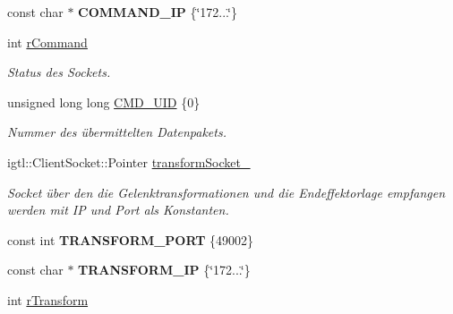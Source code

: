 \begin{DoxyCompactItemize}
\item 
\hypertarget{classRosOpenIgtlBridge_a808bb79742c62aaea43bf539f1ac677a}{const char $\ast$ {\bfseries C\-O\-M\-M\-A\-N\-D\-\_\-\-I\-P} \{\char`\"{}172...\char`\"{}\}}\label{classRosOpenIgtlBridge_a808bb79742c62aaea43bf539f1ac677a}

\item 
\hypertarget{classRosOpenIgtlBridge_ad0b28209a738b231f97717f234e380ec}{int \hyperlink{classRosOpenIgtlBridge_ad0b28209a738b231f97717f234e380ec}{r\-Command}}\label{classRosOpenIgtlBridge_ad0b28209a738b231f97717f234e380ec}

\begin{DoxyCompactList}\small\item\em Status des Sockets. \end{DoxyCompactList}\item 
\hypertarget{classRosOpenIgtlBridge_a8b21f91b5ef292bbc6a3be6c3d987602}{unsigned long long \hyperlink{classRosOpenIgtlBridge_a8b21f91b5ef292bbc6a3be6c3d987602}{C\-M\-D\-\_\-\-U\-I\-D} \{0\}}\label{classRosOpenIgtlBridge_a8b21f91b5ef292bbc6a3be6c3d987602}

\begin{DoxyCompactList}\small\item\em Nummer des übermittelten Datenpakets. \end{DoxyCompactList}\item 
igtl\-::\-Client\-Socket\-::\-Pointer \hyperlink{classRosOpenIgtlBridge_ac1cd3818cb07542c4534f7dfdb3b0258}{transform\-Socket\-\_\-}
\begin{DoxyCompactList}\small\item\em Socket über den die Gelenktransformationen und die Endeffektorlage empfangen werden mit I\-P und Port als Konstanten. \end{DoxyCompactList}\item 
\hypertarget{classRosOpenIgtlBridge_a3e034f310cd5ccc3a3c53986b13cbb16}{const int {\bfseries T\-R\-A\-N\-S\-F\-O\-R\-M\-\_\-\-P\-O\-R\-T} \{49002\}}\label{classRosOpenIgtlBridge_a3e034f310cd5ccc3a3c53986b13cbb16}

\item 
\hypertarget{classRosOpenIgtlBridge_a9f4462ec60da6213f9c8e3e5aa804d25}{const char $\ast$ {\bfseries T\-R\-A\-N\-S\-F\-O\-R\-M\-\_\-\-I\-P} \{\char`\"{}172...\char`\"{}\}}\label{classRosOpenIgtlBridge_a9f4462ec60da6213f9c8e3e5aa804d25}

\item 
\hypertarget{classRosOpenIgtlBridge_a48389d9a54fe5bb8dde3bd6b44ca85c9}{int \hyperlink{classRosOpenIgtlBridge_a48389d9a54fe5bb8dde3bd6b44ca85c9}{r\-Transform}}\label{classRosOpenIgtlBridge_a48389d9a54fe5bb8dde3bd6b44ca85c9}


\end{DoxyCompactItemize}
